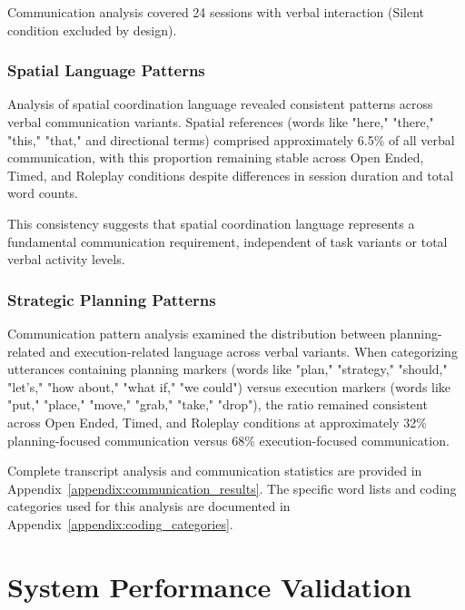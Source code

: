 Communication analysis covered 24 sessions with verbal interaction (Silent condition excluded by design).

\subsubsection{Spatial Language Patterns}

Analysis of spatial coordination language revealed consistent patterns across verbal communication variants. Spatial references (words like "here," "there," "this," "that," and directional terms) comprised approximately 6.5\% of all verbal communication, with this proportion remaining stable across Open Ended, Timed, and Roleplay conditions despite differences in session duration and total word counts.

This consistency suggests that spatial coordination language represents a fundamental communication requirement, independent of task variants or total verbal activity levels.

\subsubsection{Strategic Planning Patterns}
Communication pattern analysis examined the distribution between planning-related and execution-related language across verbal variants. When categorizing utterances containing planning markers (words like "plan," "strategy," "should," "let's," "how about," "what if," "we could") versus execution markers (words like "put," "place," "move," "grab," "take," "drop"), the ratio remained consistent across Open Ended, Timed, and Roleplay conditions at approximately 32\% planning-focused communication versus 68\% execution-focused communication.

Complete transcript analysis and communication statistics are provided in Appendix~\ref{appendix:communication_results}. The specific word lists and coding categories used for this analysis are documented in Appendix~\ref{appendix:coding_categories}.


\section{System Performance Validation}\label{sec:system_performance}

